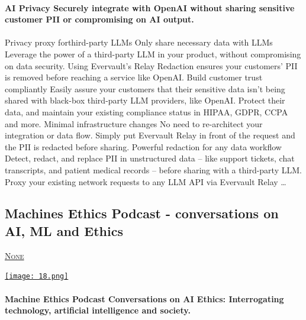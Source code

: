 \documentclass[10pt,a4paper]{article}
\begin{document}
\begin{multicols}{2}
\paragraph{}
\textbf{AI Privacy
Securely integrate with OpenAI without sharing sensitive customer PII or compromising on AI output.}
\paragraph{}

Privacy proxy forthird-party LLMs
Only share necessary data with LLMs
Leverage the power of a third-party LLM in your product, without compromising on data security. Using Evervault’s Relay Redaction ensures your customers’ PII is removed before reaching a service like OpenAI.
Build customer trust compliantly
Easily assure your customers that their sensitive data isn’t being shared with black-box third-party LLM providers, like OpenAI. Protect their data, and maintain your existing compliance status in HIPAA, GDPR, CCPA and more.
Minimal infrastructure changes
No need to re-architect your integration or data flow. Simply put Evervault Relay in front of the request and the PII is redacted before sharing.
Powerful redaction for any data workflow
Detect, redact, and replace PII in unstructured data – like support tickets, chat transcripts, and patient medical records – before sharing with a third-party LLM.
Proxy your existing network requests to any LLM API via Evervault Relay
\dots\par
\noindent\begin{minipage}{\linewidth}
\medskip
\subsection{Machines Ethics Podcast - conversations on AI, ML and Ethics}
\textsc{\footnotesize
{\scriptsize\faComments}\space 
\href{}{None} 
}
\par\medskip\noindent
\href{https://www.machine-ethics.net}{
    \texttt{[image: 18.png]}
}
\end{minipage}
\paragraph{}
\textbf{Machine Ethics Podcast
Conversations on AI Ethics:
Interrogating technology, artificial intelligence and society.}
\paragraph{}


\end{multicols}
\end{document}
